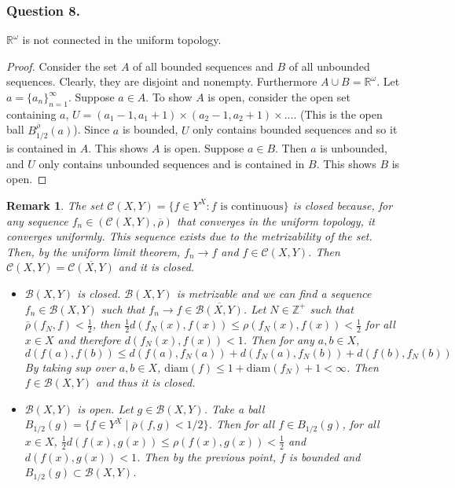 \documentclass[12pt]{article}
\newtheorem{remark}{Remark}
\begin{document}
\subsubsection*{Question 8.} $\mathbb{R}^\omega$ is not connected
in the uniform topology.
\begin{proof}
    Consider the set $A$ of all bounded sequences 
    and $B$ of all unbounded sequences. Clearly, they are disjoint and nonempty. 
    Furthermore 
    $A \cup B = \mathbb{R}^\omega$.
    Let $a  = \{a_n\}_{n=1}^\infty$. 
    Suppose $a \in A$.
    To show $A$ is open, 
    consider the open set containing $a$,
    $U = (a_1 - 1, a_1 + 1) \times (a_2 - 1, a_2 + 1) \times ...$.
    (This is the open ball $B_{1/2}^{\overline{\rho}}(a)$).
    Since $a$ is bounded, $U$ only contains bounded sequences
    and so it is contained in $A$. This shows $A$ is open.
    Suppose $a \in B$.
    Then $a$ is unbounded, and $U$ only contains unbounded sequences
    and is contained in $B$. This shows $B$ is open.


\end{proof}



\begin{remark}
    The set $\mathcal{C}(X, 
    Y) = \{f \in Y^X: f \text{ is continuous}\}$ is
    closed because, for any sequence 
    $f_n \in (\mathcal{C}(X, Y), \overline{\rho})$ that 
    converges in the uniform topology,
    it converges uniformly. This sequence exists due to the metrizability
    of the set.
    Then, by the uniform limit theorem, $f_n \rightarrow f$
    and $f \in \mathcal{C}(X, 
    Y)$. Then $\mathcal{C}(X, Y) = \overline{\mathcal{C}(X, Y)}$ 
    and it is closed. 

    \begin{itemize}
        \item $\mathcal{B}(X, Y)$ is closed.
        $\mathcal{B}(X, Y)$ is metrizable and we can
        find a sequence $f_n \in \mathcal{B}(X, Y)$ such that $f_n \rightarrow f \in 
        \overline{\mathcal{B}(X, Y)}$.
        Let $N \in \mathbb{Z}^+$ such that $\overline{\rho}(f_N, f) < \frac{1}{2}$,
        then $\frac{1}{2}d(f_N(x), f(x)) \leq \rho(f_N(x), f(x)) < \frac{1}{2}$ 
        for all $x \in X$ and therefore $d(f_N(x), f(x)) < 1$. Then 
        for any $a, b \in X$, $$d(f(a), f(b)) \leq d(f(a), f_N(a)) + 
        d(f_N(a), f_N(b)) + d(f(b), f_N(b))$$
        By taking sup over $a, b \in X$, 
        $\mathrm{diam}(f) \leq 1 + \mathrm{diam}(f_N) + 1 < \infty$.
        Then $f \in \mathcal{B}(X, Y)$ and thus it is closed.
        \item $\mathcal{B}(X, Y)$ is open. Let $g \in \mathcal{B}(X, Y)$.
        Take a ball $B_{1/2}(g) = \{f \in Y^X \mid \overline{\rho}(f, g) < 1/2\}$.
        Then for all $f \in B_{1/2}(g)$, for all $x \in X$, $\frac{1}{2}d(f(x), g(x)) 
        \leq \rho(f(x), g(x)) < \frac{1}{2}$ and $d(f(x), g(x)) < 1$. Then 
        by the previous point, $f$ is bounded and $B_{1/2}(g) \subset \mathcal{B}(X, Y)$.
    \end{itemize}
\end{remark}
\end{document}
